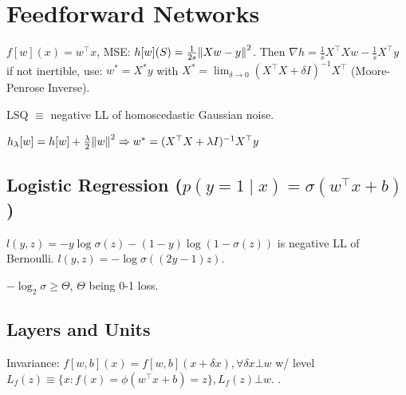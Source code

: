 \section{Feedforward Networks}

\begin{definition}
    \(f[w](x) = w^\top x\), MSE: \(h[w](S) = \frac{1}{2s} \norm{Xw - y}^2\). Then \(\nabla h = \frac 1 s X^\top X w - \frac{1}{s} X^\top y\) if not inertible, use: \(w^* = X^* y\) with \(X^* = \lim_{\delta \to 0} (X^\top X + \delta I)^{-1} X^\top\) (Moore-Penrose Inverse).
\end{definition}

\begin{lemma}
    LSQ \(\equiv\) negative LL of homoscedastic Gaussian noise.
\end{lemma}

\begin{definition}[Ridge]
    \(h_\lambda[w] = h[w] + \frac{\lambda}{2} \norm{w}^2 \Rightarrow w^* = (X^\top X + \lambda I)^{-1} X^\top y\)
\end{definition}

\subsection{Logistic Regression (\(p(y=1 \mid x) = \sigma(w^\top x + b)\))}
\begin{definition}
    \(l(y, z) = -y \log \sigma(z) - (1-y) \log (1-\sigma(z))\) is negative LL of Bernoulli.
    \(l(y, z) =  -\log \sigma((2 y - 1)z)\).
\end{definition}

\begin{definition}
    \(- \log_2 \sigma \geq \Theta\), \(\Theta\) being 0-1 loss.
\end{definition}

\subsection{Layers and Units}

\begin{definition}
    Invariance: \(f[w, b](x) = f[w, b](x + \delta x), \forall \delta x \bot w\) w/ level \(L_f(z) \equiv \{x: f(x)=\phi(w^\top x + b) = z\}, L_f(z) \bot w\).
    .
\end{definition}

